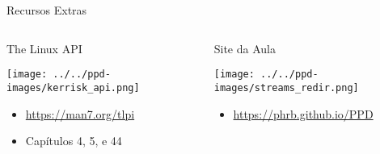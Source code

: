 \documentclass[10pt, compress, aspectratio=169, xcolor={table,usenames,dvipsnames}]{beamer}
\begin{document}
\begin{frame}[label={sec:orge3a8935}]{Recursos Extras}
\begin{columns}
\begin{column}{0.5\columnwidth}
\begin{block}{The Linux API}
\begin{center}
\texttt{[image: ../../ppd-images/kerrisk\_api.png]}
\end{center}

\begin{itemize}
\item \url{https://man7.org/tlpi}
\item Capítulos 4, 5, e 44
\end{itemize}
\end{block}
\end{column}

\begin{column}{0.5\columnwidth}
\begin{block}{Site da Aula}
\begin{center}
\texttt{[image: ../../ppd-images/streams\_redir.png]}
\end{center}

\begin{itemize}
\item \url{https://phrb.github.io/PPD}
\end{itemize}
\end{block}
\end{column}
\end{columns}
\end{frame}
\end{document}
